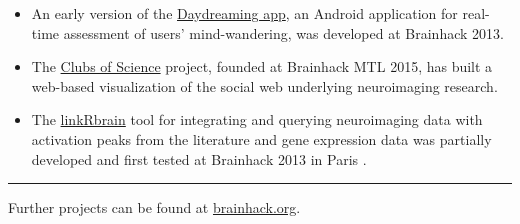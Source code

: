 \begin{table}[!ht]
\begin{itemize}
    \item
        An early version of the \href{http://daydreaming-the-app.net}{Daydreaming app}, an Android application for real-time assessment of users' mind-wandering, was developed at Brainhack 2013.
    \item 
        The \href{http://dery.xyz/projects/templates/clubsofscience.html}{Clubs of Science} project, founded at Brainhack MTL 2015, has built a web-based visualization of the social web underlying neuroimaging research.
    \item
        The \href{http://www.linkrbrain.xyz/}{linkRbrain} tool for integrating and querying neuroimaging data with activation peaks from the literature and gene expression data  was partially developed and first tested at Brainhack 2013 in Paris \cite{Mesmoudi2015}. 
    \end{itemize}
\hrule %
\smallskip Further projects can be found at \href{http://www.brainhack.org}{brainhack.org}.
\end{table}
